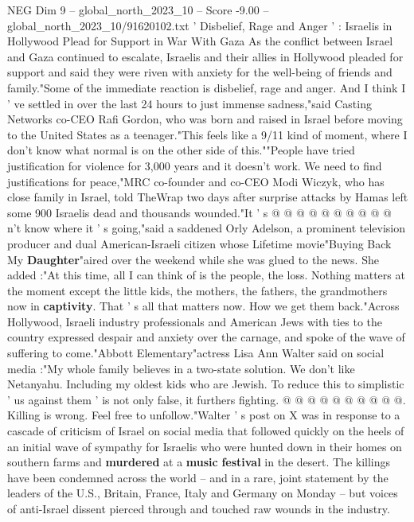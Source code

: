 \begin{textsample}{NEG Dim 9 – global\_north\_2023\_10 – Score -9.00 – global\_north\_2023\_10/91620102.txt}  \label{ex:f9_neg_036}
' Disbelief, Rage and Anger ' : Israelis in Hollywood Plead for Support in War With Gaza As the conflict between Israel and Gaza continued to escalate, Israelis and their allies in Hollywood pleaded for support and said they were riven with anxiety for the well-being of friends and family."Some of the immediate reaction is disbelief, rage and anger.
And I think I ' ve settled in over the last 24 hours to just immense sadness,"said Casting Networks co-CEO Rafi Gordon, who was born and raised in Israel before moving to the United States as a teenager."This feels like a 9/11 kind of moment, where I don't know what normal is on the other side of this.""People have tried justification for violence for 3,000 years and it doesn't work.
We need to find justifications for peace,"MRC co-founder and co-CEO Modi Wiczyk, who has close family in Israel, told TheWrap two days after surprise attacks by Hamas left some 900 Israelis dead and thousands wounded."It ' s @ @ @ @ @ @ @ @ @ @ n't know where it ' s going,"said a saddened Orly Adelson, a prominent television producer and dual American-Israeli citizen whose Lifetime movie"Buying Back My \textbf{Daughter}"aired over the weekend while she was glued to the news.
She added :"At this time, all I can think of is the people, the loss.
Nothing matters at the moment except the little kids, the mothers, the fathers, the grandmothers now in \textbf{captivity}.
That ' s all that matters now.
How we get them back."Across Hollywood, Israeli industry professionals and American Jews with ties to the country expressed despair and anxiety over the carnage, and spoke of the wave of suffering to come."Abbott Elementary"actress Lisa Ann Walter said on social media :"My whole family believes in a two-state solution.
We don't like Netanyahu.
Including my oldest kids who are Jewish.
To reduce this to simplistic ' us against them ' is not only false, it furthers fighting. @ @ @ @ @ @ @ @ @ @.
Killing is wrong.
Feel free to unfollow."Walter ' s post on X was in response to a cascade of criticism of Israel on social media that followed quickly on the heels of an initial wave of sympathy for Israelis who were hunted down in their homes on southern farms and \textbf{murdered} at a \textbf{music} \textbf{festival} in the desert.
The killings have been condemned across the world -- and in a rare, joint statement by the leaders of the U.S., Britain, France, Italy and Germany on Monday -- but voices of anti-Israel dissent pierced through and touched raw wounds in the industry.

\end{textsample}
